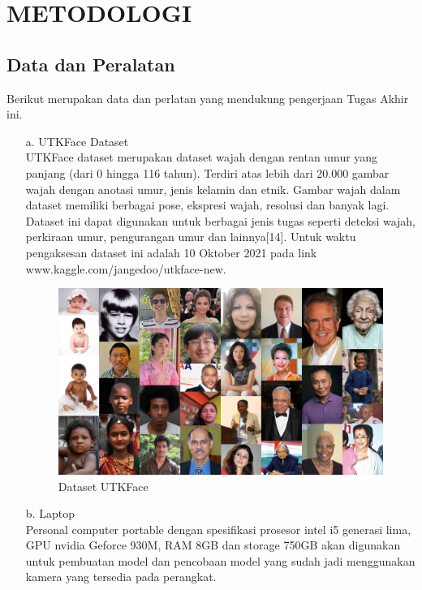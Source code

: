 \section{METODOLOGI}


\subsection{Data dan Peralatan}

Berikut merupakan data dan perlatan yang mendukung pengerjaan Tugas Akhir ini.
\begin{itemize}
   \item [a.] UTKFace Dataset \\
   UTKFace dataset  merupakan dataset wajah dengan rentan umur yang panjang (dari 0 hingga 116 tahun). 
   Terdiri atas lebih dari 20.000 gambar wajah dengan anotasi umur, jenis kelamin dan etnik. Gambar wajah
   dalam dataset memiliki berbagai pose, ekspresi wajah, resolusi dan banyak lagi. Dataset ini dapat 
   digunakan untuk berbagai jenis tugas seperti deteksi wajah, perkiraan umur, pengurangan umur dan 
   lainnya[14]. Untuk waktu pengaksesan dataset ini adalah 10 Oktober 2021 pada link 
   www.kaggle.com/jangedoo/utkface-new.
    \begin{figure} [H] \centering
      \includegraphics[scale=0.2]{gambar/UTKFace.png}
      \caption{Dataset UTKFace}
      \label{fig:UTKFace}
    \end{figure}

   \item [b.] Laptop \\
   Personal computer portable dengan spesifikasi prosesor intel i5 generasi lima, GPU nvidia Geforce 930M, 
   RAM 8GB dan storage 750GB akan digunakan untuk pembuatan model dan pencobaan model yang sudah jadi 
   menggunakan kamera yang tersedia pada perangkat.


\end{itemize}
